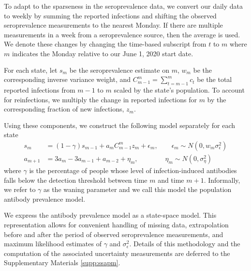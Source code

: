 \documentclass{article}
\begin{document}
To adapt to the sparseness in the seroprevalence data, we convert our daily data 
to weekly by summing the reported infections and shifting the observed 
seroprevalence measurements to the nearest Monday. If there are multiple 
measurements in a week from a seroprevalence source, then the average is used. 
We denote these changes by changing the time-based subscript 
from $t$ to $m$ where $m$ indicates the Monday 
relative to our June 1, 2020 start date.

For each state, let $s_m$ be the seroprevalence estimate on $m$, $w_m$ be the
corresponding inverse variance weight, and
 $C_{m-1}^m = \sum_{t = m-1}^{m} c_t$ be the total reported infections from $m-1$ to $m$
scaled by the state's population. 
To account for reinfections, we multiply the change in reported infections for $m$
by the corresponding fraction of new infections, $z_m$. 

Using these components, we construct the following model separately for each state
\begin{align}
s_m &= (1 -\gamma)s_{m-1} + a_m C_{m-1}^m z_m + \epsilon_m, \qquad \epsilon_m \sim N(0, w_m \sigma^2_\epsilon) \label{eq:waningpr}  \\
a_{m+1} &= 3a_{m} - 3a_{m-1} + a_{m-2} + \eta_m,\qquad\qquad \eta_m \sim N(0, \sigma^2_{\eta})   \nonumber
\end{align}
where $\gamma$ is the percentage
of people whose level of infection-induced antibodies falls below the detection 
threshold between time $m$ and time $m+1$.
Informally, we refer to $\gamma$ as the waning parameter and we call this model the population 
antibody prevalence model. 

We express the antibody prevalence model as a state-space model. This representation
allows for convenient handling of missing data, extrapolation before and after
the period of observed seroprevalence measurements, and maximum likelihood
estimates of $\gamma$ and $\sigma^2_\epsilon$. Details of this methodology and
the computation of the associated uncertainty measurements are deferred to the
Supplementary Materials \ref{supp:ssapm}.
\end{document}
